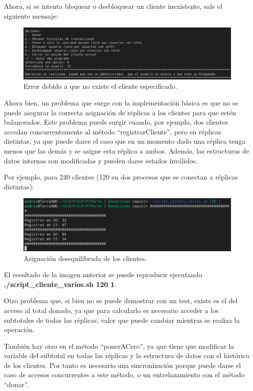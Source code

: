 \documentclass{article}
\begin{document}
Ahora, si se intenta bloquear o desbloquear un cliente inexistente, sale el siguiente mensaje:
\begin{figure}[H]
    \centering
    \includegraphics[width=\textwidth]{imagenes/bloqueo/6.png}
    \caption{Error debido a que no existe el cliente especificado.}
\end{figure}


Ahora bien, un problema que surge con la implementación básica es que no se puede asegurar la correcta asignación de réplicas a los clientes para que estén balanceados. Este problema puede surgir cuando, por ejemplo, dos clientes accedan concurrentemente al método ``registrarCliente'', pero en réplicas distintas, ya que puede darse el caso que en un momento dado una réplica tenga menos que las demás y se asigne esta réplica a ambos. Además, las estructuras de datos internas son modificadas y pueden darse estados inválidos.

Por ejemplo, para 240 clientes (120 en dos procesos que se conectan a réplicas distintas):

\begin{figure}[H]
    \centering
    \includegraphics[width=\textwidth]{imagenes/varios/incorrecto.png}
    \caption{Asignación desequilibrada de los clientes.}
\end{figure}

El resultado de la imagen anterior se puede reproducir ejecutando \textbf{./script\_cliente\_varios.sh 120 1}.

Otro problema que, si bien no se puede demostrar con un test, existe es el del acceso al total donado, ya que para calcularlo es necesario acceder a los subtotales de todas las réplicas, valor que puede cambiar mientras se realiza la operación.

También hay otro en el método ``ponerACero'', ya que tiene que modificar la variable del subtotal en todas las réplicas y la estructura de datos con el histórico de los clientes. Por tanto es necesario una sincronización porque puede darse el caso de accesos concurrentes a este método, o un entrelazamiento con el método ``donar''.
\end{document}
